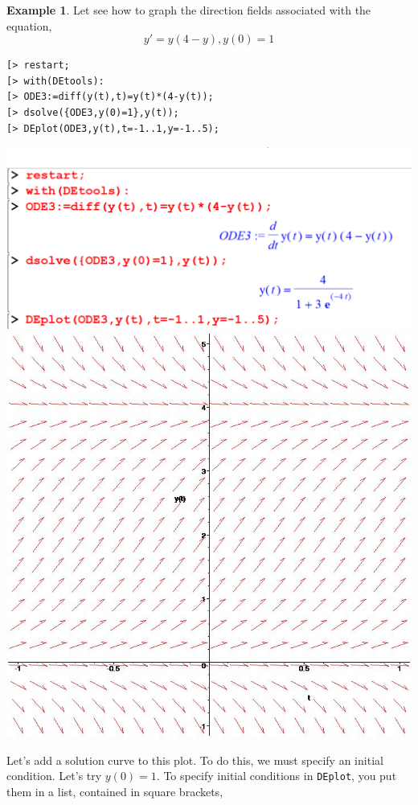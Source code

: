 \documentclass[
]{book}
\theoremstyle{definition}
\theoremstyle{definition}
\newtheorem{example}{Example}[chapter]
\theoremstyle{definition}
\theoremstyle{definition}
\theoremstyle{remark}
\begin{document}
\begin{example}
\protect\hypertarget{exm:unnamed-chunk-36}{}\label{exm:unnamed-chunk-36}Let see how to graph the direction fields associated with the equation,
\[y' = y(4 − y), y(0) = 1\]
\end{example}

\begin{verbatim}
[> restart;
[> with(DEtools):
[> ODE3:=diff(y(t),t)=y(t)*(4-y(t));
[> dsolve({ODE3,y(0)=1},y(t));
[> DEplot(ODE3,y(t),t=-1..1,y=-1..5);
\end{verbatim}

\includegraphics{figures/Diff/Diff 6.5 -1.png}
\includegraphics{figures/Diff/Diff 6.5 -2.jpg}

Let's add a solution curve to this plot. To do this, we must specify an initial condition. Let's try \(y(0)=1\). To specify initial conditions in \texttt{DEplot}, you put them in a list, contained in square brackets,
\end{document}
